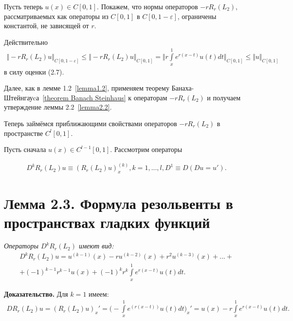 Пусть теперь $ u(x) \in C[0,1] $. Покажем, что нормы операторов $ -rR_r(L_2) $, рассматриваемых как операторы из $ C[0,1] $ в $ C[0,1-\varepsilon] $, ограничены константой, не зависящей от $ r $.

Действительно
\begin{equation}
\begin{array}{c}
\nonumber

\Vert -rR_r(L_2)u \Vert_{C[0,1-\varepsilon]} \leq \Vert -rR_r(L_2)u \Vert_{C[0,1]} = \biggl\Vert r\int\limits_x^1 e^{r(x-t)}u(t)dt\biggr\Vert_{C[0,1]} \leq \Vert u \Vert_{C[0,1]}

\end{array}
\end{equation}
в силу оценки (2.7).

Далее, как в лемме 1.2~\eqref{lemma1.2}, применяем теорему Банаха-Штейнгауcа~\eqref{theorem Banach Steinhaus} к операторам $ -rR_r(L_2) $ и получаем утверждение леммы 2.2~\eqref{lemma2.2}.

Теперь займёмся приближающими свойствами операторов $ -rR_r(L_2) $ в пространстве $ C^l[0,1] $.

Пусть сначала $ u(x) \in C^{l-1}[0,1] $. Рассмотрим операторы

\begin{equation}
\begin{array}{c}
\nonumber

D^kR_r(L_2)u \equiv (R_r(L_2)u)_x^{(k)}, k = 1,...,l, D^1 \equiv D (Du = u').

\end{array}
\end{equation}

\section{Лемма 2.3. Формула резольвенты в пространствах гладких функций}
\label{lemma2.3}
\textit{Операторы $ D^kR_r(L_2) $ имеют вид:}
\begin{equation}
\begin{array}{c}

D^kR_r(L_2)u = u^{(k-1)}(x) - ru^{(k-2)}(x) + r^2u^{(k-3)}(x) + ... + \\
+ (-1)^{k-1}r^{k-1}u(x) + (-1)^kr^k\int\limits_x^1 e^{r(x-t)}u(t)dt.

\end{array}
\end{equation}

\textbf{Доказательство.} Для $ k = 1 $ имеем:
\begin{equation}
\begin{array}{c}
\nonumber

DR_r(L_2)u = (R_r(L_2)u)_x' = \biggl( -\int\limits_x^1 e^(r(x-t))u(t)dt \biggr)_x' = u(x) - r\int\limits_x^1 e^{r(x-t)}u(t)dt.

\end{array}
\end{equation}

